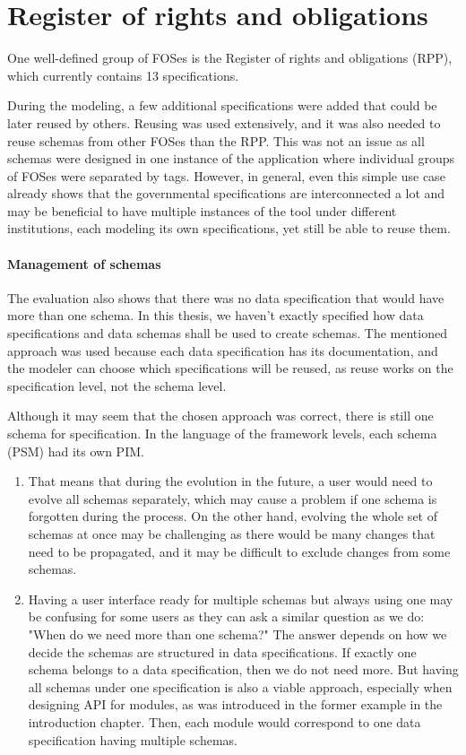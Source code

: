 \section{Register of rights and obligations}\label{sec:register-of-rights-and-obligations}

One well-defined group of FOSes is the Register of rights and obligations (RPP), which currently contains 13 specifications.

During the modeling, a few additional specifications were added that could be later reused by others. Reusing was used extensively, and it was also needed to reuse schemas from other FOSes than the RPP. This was not an issue as all schemas were designed in one instance of the application where individual groups of FOSes were separated by tags. However, in general, even this simple use case already shows that the governmental specifications are interconnected a lot and may be beneficial to have multiple instances of the tool under different institutions, each modeling its own specifications, yet still be able to reuse them.

\paragraph{Management of schemas} The evaluation also shows that there was no data specification that would have more than one schema. In this thesis, we haven't exactly specified how data specifications and data schemas shall be used to create schemas. The mentioned approach was used because each data specification has its documentation, and the modeler can choose which specifications will be reused, as reuse works on the specification level, not the schema level.

Although it may seem that the chosen approach was correct, there is still one schema for specification. In the language of the framework levels, each schema (PSM) had its own PIM.
\begin{enumerate}
    \item That means that during the evolution in the future, a user would need to evolve all schemas separately, which may cause a problem if one schema is forgotten during the process. On the other hand, evolving the whole set of schemas at once may be challenging as there would be many changes that need to be propagated, and it may be difficult to exclude changes from some schemas.
    \item Having a user interface ready for multiple schemas but always using one may be confusing for some users as they can ask a similar question as we do: "When do we need more than one schema?" The answer depends on how we decide the schemas are structured in data specifications. If exactly one schema belongs to a data specification, then we do not need more. But having all schemas under one specification is also a viable approach, especially when designing API for modules, as was introduced in the former example in the introduction chapter. Then, each module would correspond to one data specification having multiple schemas.
\end{enumerate}

